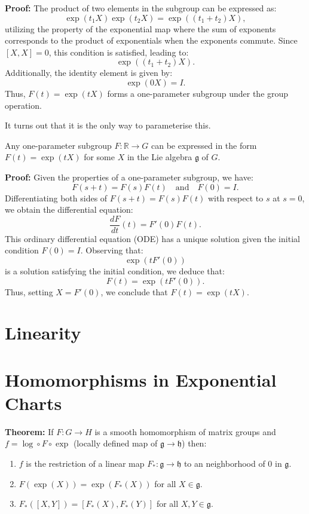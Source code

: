 \documentclass{article}
\begin{document}
\textbf{Proof:}
The product of two elements in the subgroup can be expressed as:
\[
\exp(t_1 X) \exp(t_2 X) = \exp((t_1 + t_2)X),
\]
utilizing the property of the exponential map where the sum of exponents corresponds to the product of exponentials when the exponents commute. Since \([X, X] = 0\), this condition is satisfied, leading to:
\[
\exp((t_1 + t_2)X).
\]
Additionally, the identity element is given by:
\[
\exp(0X) = I.
\]
Thus, \( F(t) = \exp(tX) \) forms a one-parameter subgroup under the group operation.

It turns out that it is the only way to parameterise this. 

\begin{theorem} 
    Any one-parameter subgroup \( F: \mathbb{R} \to G \) can be expressed in the form \( F(t) = \exp(tX) \) for some \( X \) in the Lie algebra \( \mathfrak{g} \) of \( G \).
\end{theorem}

\textbf{Proof:}
Given the properties of a one-parameter subgroup, we have:
\[
F(s + t) = F(s)F(t) \quad \text{and} \quad F(0) = I.
\]
Differentiating both sides of \( F(s + t) = F(s)F(t) \) with respect to \( s \) at \( s = 0 \), we obtain the differential equation:
\[
\frac{dF}{dt}(t) = F'(0)F(t).
\]
This ordinary differential equation (ODE) has a unique solution given the initial condition \( F(0) = I \). Observing that:
\[
\exp(tF'(0))
\]
is a solution satisfying the initial condition, we deduce that:
\[
F(t) = \exp(tF'(0)).
\]
Thus, setting \( X = F'(0) \), we conclude that \( F(t) = \exp(tX) \).

\section{Linearity}

\section*{Homomorphisms in Exponential Charts}

\textbf{Theorem:} If \( F: G \to H \) is a smooth homomorphism of matrix groups and \( f = \log \circ F \circ \exp \) (locally defined map of \(\mathfrak{g} \to \mathfrak{h}\)) then:
\begin{enumerate}
    \item \( f \) is the restriction of a linear map \( F_*: \mathfrak{g} \to \mathfrak{h} \) to an neighborhood of \( 0 \) in \(\mathfrak{g}\).
    \item \( F(\exp(X)) = \exp(F_*(X)) \) for all \( X \in \mathfrak{g} \).
    \item \( F_*([X, Y]) = [F_*(X), F_*(Y)] \) for all \( X, Y \in \mathfrak{g} \).
\end{enumerate}
\end{document}
